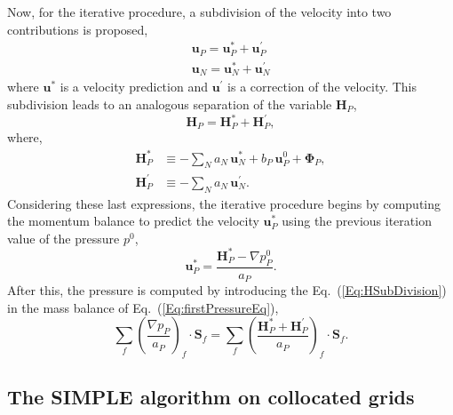 \documentclass[final,3p,times,11pt,onecolumn]{myElsarticle}
\numberwithin{equation}{section}
\begin{document}
Now, for the iterative procedure, a subdivision of the velocity into two contributions is proposed,
\begin{align}
\label{Eq:velocitySubdiv}
\boldsymbol{u}_P
= 
\boldsymbol{u}_P^{*} 
+
\boldsymbol{u}_P^{'} \\
\boldsymbol{u}_N
= 
\boldsymbol{u}_N^{*} 
+
\boldsymbol{u}_N^{'}
\end{align}
where $\boldsymbol{u}^{*}$ is a velocity prediction and $\boldsymbol{u}^{'}$ is a correction of the velocity. This subdivision leads to an analogous separation of the variable $\boldsymbol{H}_P$,
\begin{equation}
\label{Eq:HSubDivision}
\boldsymbol{H}_P 
=
\boldsymbol{H}_P^{*}
+
\boldsymbol{H}_P^{'},
\end{equation}
where,
\begin{align}
\label{Eq:HStar}
\boldsymbol{H}_P^{*} 
&\equiv -\sum_{N} a_{N}\,\boldsymbol{u}_{N}^{*}
+
b_P\, \boldsymbol{u}^0_P 
+ 
\boldsymbol{\Phi}_P,
\\
\label{Eq:HPrima}
\boldsymbol{H}_P^{'}
&\equiv -\sum_{N} a_{N}\,\boldsymbol{u}_{N}^{'}. 
\end{align}
Considering these last expressions, the iterative procedure begins by computing the momentum balance to predict the velocity $\boldsymbol{u}_P^{*}$ using the previous iteration value of the pressure $p^{0}$,
\begin{equation}
\label{Eq:MomentumPredictor}
\boldsymbol{u}_P^{*}
=
\dfrac
{
\boldsymbol{H}_P^*
- 
\nabla p_P^{0}}
{a_P}.
\end{equation}
After this, the pressure is computed by introducing the Eq.~(\ref{Eq:HSubDivision}) in the mass balance of Eq.~(\ref{Eq:firstPressureEq}),
\begin{equation}
\label{Eq:pressureEqSubdiv}
\sum_{f} 
\left(
\dfrac
{
\nabla p_P}
{a_P}
\right)_f
\cdotp 
\textbf{S}_{f}
=
\sum_{f} 
\left(
\dfrac
{
\boldsymbol{H}_P^{*}
+
\boldsymbol{H}_P^{'}
}
{a_P}
\right)_f
\cdotp 
\textbf{S}_{f}.
\end{equation}

\subsection{The SIMPLE algorithm on collocated grids}
\end{document}
